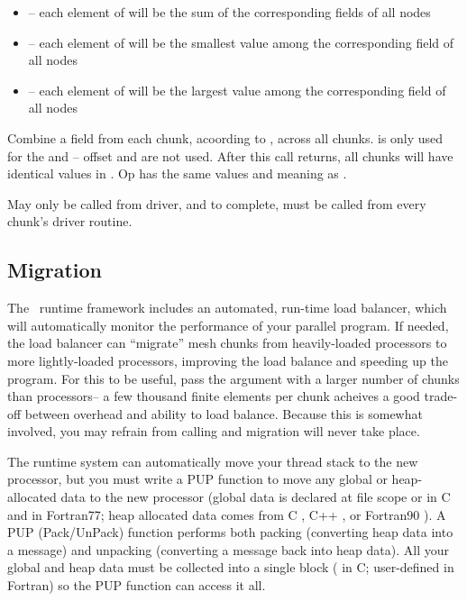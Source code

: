 \documentclass[10pt]{article}
\begin{document}
\begin{itemize}
        \item {}-- each element of  will be the sum 
of the corresponding fields of all nodes
        \item {}-- each element of  will be the 
smallest value among the corresponding field of all nodes
        \item {}-- each element of  will be the largest 
value among the corresponding field of all nodes
\end{itemize}


     Combine a field from each chunk, acoording to , across all chunks.
 is only used for the  and -- offset and
 are not used.  After this call returns, all chunks will have
identical values in .  Op has the same values and meaning as
.

     May only be called from driver, and to complete, must be called
     from every chunk's driver routine.

\subsection{Migration}

The \charmpp\ runtime framework includes an automated, run-time load balancer,
which will automatically monitor the performance of your parallel program.
If needed, the load balancer can ``migrate'' mesh chunks from heavily-loaded
processors to more lightly-loaded processors, improving the load balance and
speeding up the program.  For this to be useful, pass the  argument
with a larger number of chunks  than processors-- a few thousand
finite elements per chunk acheives a good trade-off between overhead and
ability to load balance.  Because this is somewhat involved, you
may refrain from calling  and migration will never take place.

The runtime system can automatically move your thread stack to the new
processor, but you must write a PUP function to move any global or
heap-allocated data to the new processor (global data is declared at file scope
or  in C and  in Fortran77; heap allocated data comes
from C , C++ , or Fortran90 ).  A PUP
(Pack/UnPack) function performs both packing (converting heap data into a
message) and unpacking (converting a message back into heap data).  All your
global and heap data must be collected into a single block ( in C;
user-defined  in Fortran) so the PUP function can access it all.
\end{document}
